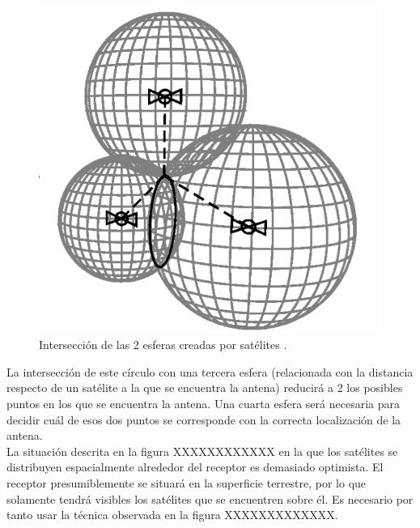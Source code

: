 \begin{figure}
	\centering
	\includegraphics[width=1\textwidth]{imagenes/interseccion2esferas.PNG}
	\caption{\label{fig1}Intersección de las 2 esferas creadas por satélites \cite{gnss}.}
\end{figure}

La intersección de este círculo con una tercera esfera (relacionada con la distancia respecto de un satélite a la que se encuentra la antena) reducirá a 2 los posibles puntos en los que se encuentra la antena. Una cuarta esfera será necesaria para decidir cuál de esos dos puntos se corresponde con la correcta localización de la antena. \newline\\

La situación descrita en la figura XXXXXXXXXXXX en la que los satélites se distribuyen espacialmente alrededor del receptor es demasiado optimista. El receptor presumiblemente se situará en la superficie terrestre, por lo que solamente tendrá visibles los satélites que se encuentren sobre él. Es necesario por tanto usar la técnica observada en la figura XXXXXXXXXXXXX. \newline

